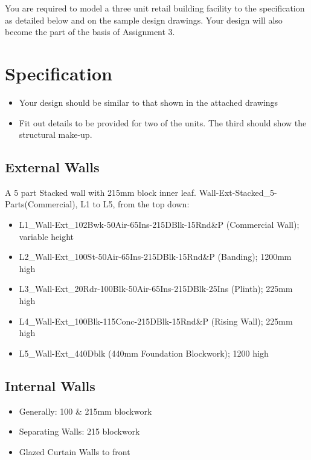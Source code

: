 \vspace{1cm}



You are required to model a three unit retail building facility to the specification as detailed below and on the sample design drawings.  Your design will also become the part of the basis of Assignment 3.

\section*{Specification}


\begin{itemize}
	\item Your design should be similar to that shown in the attached drawings
	\item Fit out details to be provided for two of the units.  The third should show the structural make-up.
\end{itemize}


\subsection*{External Walls}
A 5 part Stacked wall with 215mm block inner leaf.  Wall-Ext-Stacked\_5-Parts(Commercial), L1 to L5, from the top down:
\begin{itemize}
	\item L1\_Wall-Ext\_102Bwk-50Air-65Ins-215DBlk-15Rnd\&P (Commercial Wall); variable height
	\item L2\_Wall-Ext\_100St-50Air-65Ins-215DBlk-15Rnd\&P (Banding); 1200mm high
	\item L3\_Wall-Ext\_20Rdr-100Blk-50Air-65Ins-215DBlk-25Ins (Plinth); 225mm high
	\item L4\_Wall-Ext\_100Blk-115Conc-215DBlk-15Rnd\&P (Rising Wall); 225mm high
	\item L5\_Wall-Ext\_440Dblk (440mm Foundation Blockwork); 1200 high
\end{itemize}




\subsection*{Internal Walls}
\begin{itemize}
	\item Generally: 100 \& 215mm blockwork
	\item Separating Walls: 215 blockwork
	\item Glazed Curtain Walls to front
\end{itemize}



